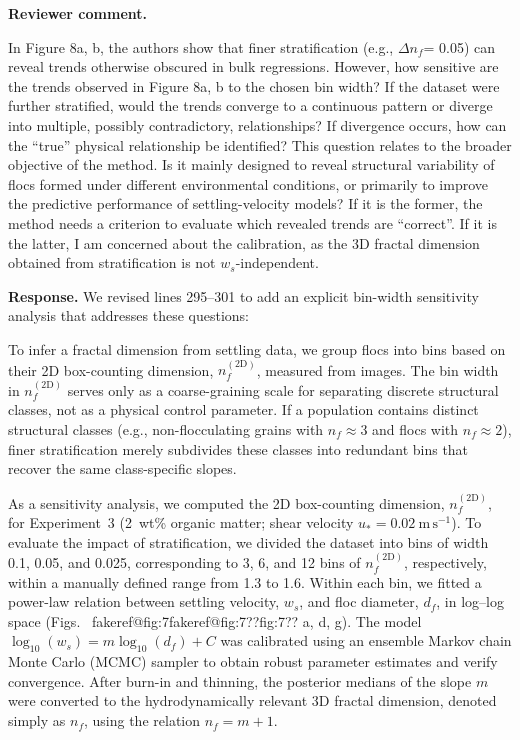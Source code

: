 \documentclass[11pt]{article}
\makeatletter
\newenvironment{Snippet}{%
  \par\vspace{0.3em}\begin{list}{}{\setlength{\leftmargin}{1em}\setlength{\rightmargin}{0.5em}}\item\small\itshape
}{%
  \end{list}\vspace{0.3em}
}
\newcommand{\fakeref}[1]{%
  \ifcsname fakeref@#1\endcsname\csname fakeref@#1\endcsname\else ??#1??\fi
}
\renewcommand{\ref}[1]{\fakeref{#1}}%
\makeatother
\begin{document}
\begin{enumerate}[label=\textbf{R3.\arabic*.}]
\item \textbf{Reviewer comment.}
\begin{Snippet}
In Figure 8a, b, the authors show that finer stratification (e.g., $\Delta n_f$= 0.05) can reveal trends otherwise obscured in bulk regressions. However, how sensitive are the trends observed in Figure 8a, b to the chosen bin width? If the dataset were further stratified, would the trends converge to a continuous pattern or diverge into multiple, possibly contradictory, relationships? If divergence occurs, how can the ``true'' physical relationship be identified? This question relates to the broader objective of the method. Is it mainly designed to reveal structural variability of flocs formed under different environmental conditions, or primarily to improve the predictive performance of settling-velocity models? If it is the former, the method needs a criterion to evaluate which revealed trends are ``correct''. If it is the latter, I am concerned about the calibration, as the 3D fractal dimension obtained from stratification is not $w_s$-independent.
\end{Snippet}
\textbf{Response.}
We revised lines 295--301 to add an explicit bin-width sensitivity analysis that addresses these questions:
\begin{Snippet}
To infer a fractal dimension from settling data, we group flocs into bins based on their 2D box-counting dimension, $n_f^{(\mathrm{2D})}$, measured from images. The bin width in $n_f^{(\mathrm{2D})}$ serves only as a coarse-graining scale for separating discrete structural classes, not as a physical control parameter. If a population contains distinct structural classes (e.g., non-flocculating grains with $n_f \approx 3$ and flocs with $n_f \approx 2$), finer stratification merely subdivides these classes into redundant bins that recover the same class-specific slopes.

As a sensitivity analysis, we computed the 2D box-counting dimension, $n_f^{(\mathrm{2D})}$, for Experiment~3 (2~wt\% organic matter; shear velocity $u_* = 0.02~\mathrm{m\,s^{-1}}$). To evaluate the impact of stratification, we divided the dataset into bins of width 0.1, 0.05, and 0.025, corresponding to 3, 6, and 12 bins of $n_f^{(\mathrm{2D})}$, respectively, within a manually defined range from 1.3 to 1.6. Within each bin, we fitted a power-law relation between settling velocity, $w_s$, and floc diameter, $d_f$, in log--log space (Figs.~\ref{fig:7}a, d, g). The model $\log_{10}(w_s) = m \log_{10}(d_f) + C$ was calibrated using an ensemble Markov chain Monte Carlo (MCMC) sampler to obtain robust parameter estimates and verify convergence. After burn-in and thinning, the posterior medians of the slope $m$ were converted to the hydrodynamically relevant 3D fractal dimension, denoted simply as $n_f$, using the relation $n_f = m + 1$.


\end{Snippet}
\end{enumerate}
\end{document}
